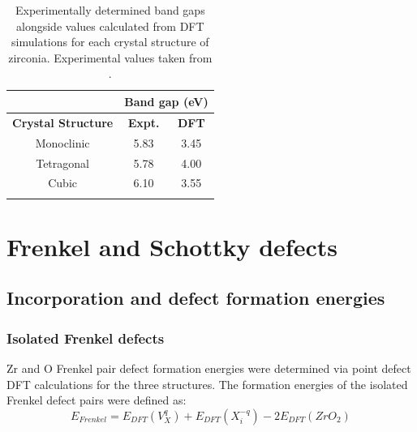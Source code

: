 \begin{table}[ht] %
\onehalfspacing
\centering
\caption[Experimentally determined band gaps alongside values calculated from DFT simulations for each crystal structure of zirconia.]{Experimentally determined band gaps alongside values calculated from DFT simulations for each crystal structure of zirconia. Experimental values taken from \cite{French1994}.}
\begin{tabular}{ccc}
{\bf }                                       & \multicolumn{2}{c}{{\bf Band gap (eV)}}      \\ \hline
\multicolumn{1}{c}{{\bf Crystal Structure}} & \multicolumn{1}{c}{{\bf Expt.}} & {\bf DFT} \\ \hline
\multicolumn{1}{c}{Monoclinic}              & \multicolumn{1}{c}{5.83}        & 3.45      \\
\multicolumn{1}{c}{Tetragonal}              & \multicolumn{1}{c}{5.78}        & 4.00      \\
\multicolumn{1}{c}{Cubic}                   & \multicolumn{1}{c}{6.10}         &   3.55 \\ \hline
\label{table:bandgap}
\end{tabular}
\end{table}


\section{Frenkel and Schottky defects}

\subsection{Incorporation and defect formation energies}

\subsubsection*{Isolated Frenkel defects}

Zr and O Frenkel pair defect formation energies were determined via point defect DFT calculations for the three structures. The formation energies of the isolated Frenkel defect pairs were defined as: %
\begin{equation}
\label{equation_frenkel}
E_{Frenkel} = E_{DFT}(V^{q}_{X}) + E_{DFT}(X^{-q}_{i}) - 2E_{DFT}(ZrO_2)%
\end{equation}

